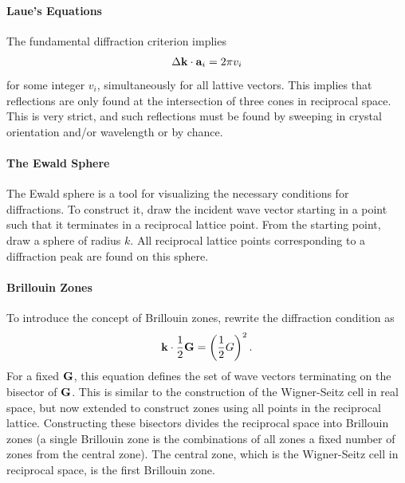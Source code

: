 \paragraph{Laue's Equations}
The fundamental diffraction criterion implies
\begin{align*}
	\Delta\vb{k}\cdot\vb{a}_{i} = 2\pi v_{i}
\end{align*}
for some integer $v_{i}$, simultaneously for all lattive vectors. This implies that reflections are only found at the intersection of three cones in reciprocal space. This is very strict, and such reflections must be found by sweeping in crystal orientation and/or wavelength or by chance.

\paragraph{The Ewald Sphere}
The Ewald sphere is a tool for visualizing the necessary conditions for diffractions. To construct it, draw the incident wave vector starting in a point such that it terminates in a reciprocal lattice point. From the starting point, draw a sphere of radius $k$. All reciprocal lattice points corresponding to a diffraction peak are found on this sphere.

\paragraph{Brillouin Zones}
To introduce the concept of Brillouin zones, rewrite the diffraction condition as
\begin{align*}
	\vb{k}\cdot\frac{1}{2}\vb{G} = \left(\frac{1}{2}G\right)^{2}.
\end{align*}
For a fixed $\vb{G}$, this equation defines the set of wave vectors terminating on the bisector of $\vb{G}$. This is similar to the construction of the Wigner-Seitz cell in real space, but now extended to construct zones using all points in the reciprocal lattice. Constructing these bisectors divides the reciprocal space into Brillouin zones (a single Brillouin zone is the combinations of all zones a fixed number of zones from the central zone). The central zone, which is the Wigner-Seitz cell in reciprocal space, is the first Brillouin zone.

